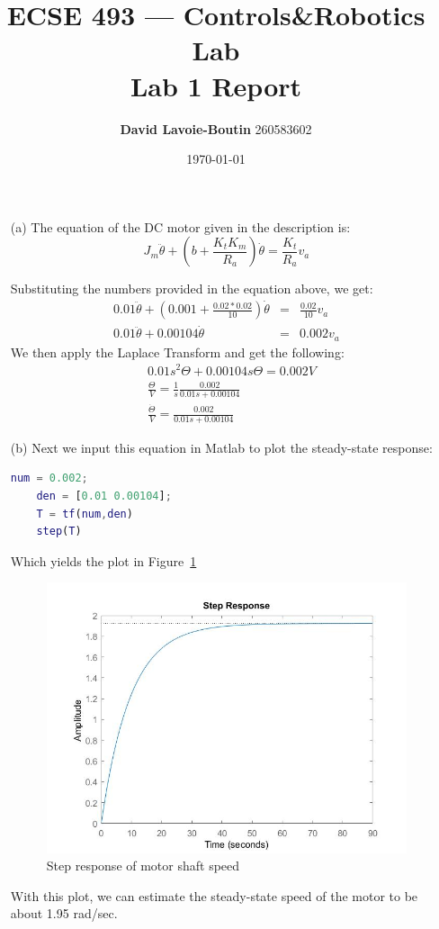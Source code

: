 \documentclass{article}
\title{ECSE 493 --- Controls\&Robotics Lab\\Lab 1 Report}
\author{\textbf{David Lavoie-Boutin} 260583602}
\date{\today}
\begin{document}
\maketitle
\section{}
\begin{itemize}
    \item [(a)] The equation of the DC motor given in the description is:
    $$J_m \ddot{\theta} + \left(b + \frac{K_tK_m}{R_a} \right)\dot{\theta} = \frac{K_t}{R_a} v_a$$

    Substituting the numbers provided in the equation above, we get:
    \begin{eqnarray}
    0.01 \ddot{\theta} + \left(0.001 + \frac{0.02 * 0.02}{10} \right)\dot{\theta} &=& \frac{0.02}{10} v_a\\
    0.01 \ddot{\theta} + 0.00104 \dot{\theta} &=&0.002 v_a
    \end{eqnarray}
    We then apply the Laplace Transform and get the following:
    \begin{eqnarray}
        &0.01 s^2 \Theta + 0.00104 s \Theta = 0.002 V\\
        &\frac{\Theta}{V} = \frac{1}{s}\frac{0.002}{0.01s + 0.00104}\\
        &\frac{\dot{\Theta}}{V} = \frac{0.002}{0.01s + 0.00104}
    \end{eqnarray}
\clearpage

    \item [(b)] Next we input this equation in Matlab to plot the steady-state response:
    \begin{lstlisting}[language=Matlab]
    num = 0.002;
    den = [0.01 0.00104];
    T = tf(num,den)
    step(T)
    \end{lstlisting}

    Which yields the plot in Figure~\ref{fig:stepa}

    \begin{figure}[!htb]
        \centering
        \includegraphics[width=.6\linewidth]{Step(a).jpg}
        \caption{Step response of motor shaft speed}
        \label{fig:stepa}
    \end{figure}
    With this plot, we can estimate the steady-state speed of the motor to be about 1.95 rad/sec.


\end{itemize}
\end{document}
